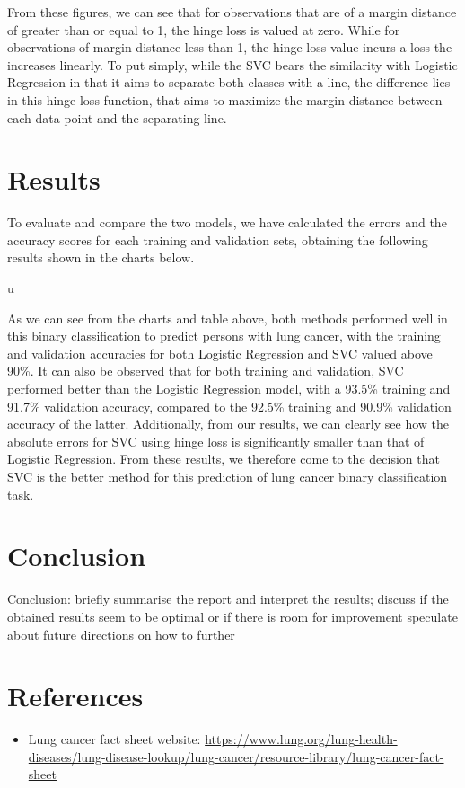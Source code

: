 \documentclass[a4paper,12pt]{article}
\begin{document}
From these figures, we can see that for observations that are of a margin distance of greater than or equal to 1, the hinge loss is valued at zero. While for observations of margin distance less than 1, the hinge loss value incurs a loss the increases linearly. To put simply, while the SVC bears the similarity with Logistic Regression in that it aims to separate both classes with a line, the difference lies in this hinge loss function, that aims to maximize the margin distance between each data point and the separating line.

\section{Results}
\label{sec:orge8000d9}

To evaluate and compare the two models, we have calculated the errors and the accuracy scores for each training and validation sets, obtaining the following results shown in the charts below.

u

As we can see from the charts and table above, both methods performed well in this binary classification to predict persons with lung cancer, with the training and validation accuracies for both Logistic Regression and SVC valued above 90\%. It can also be observed that for both training and validation, SVC performed better than the Logistic Regression model, with a 93.5\% training and 91.7\% validation accuracy, compared to the 92.5\% training and 90.9\% validation accuracy of the latter.
Additionally, from our results, we can clearly see how the absolute errors for SVC using hinge loss is significantly smaller than that of Logistic Regression.
From these results, we therefore come to the decision that SVC is the better method for this prediction of lung cancer binary classification task.



\section{Conclusion}
\label{sec:org99c536d}
Conclusion:
briefly summarise the report and interpret the results;
 discuss if the obtained results seem to be optimal or if there is room for improvement
speculate about future directions on how to further



\section{References}
\label{sec:org92ca122}
\begin{itemize}
\item\relax [1] Lung cancer fact sheet website:  \url{https://www.lung.org/lung-health-diseases/lung-disease-lookup/lung-cancer/resource-library/lung-cancer-fact-sheet}
\end{itemize}
\end{document}
